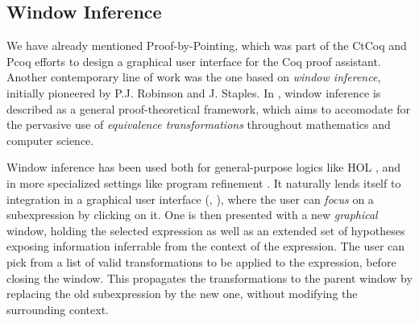 
\subsection*{Window Inference}

We have already mentioned Proof-by-Pointing, which was part of the CtCoq and
Pcoq efforts  to design a graphical user
interface for the Coq proof assistant. Another contemporary line of work was the
one based on \emph{window inference}, initially pioneered by P.J. Robinson and
J. Staples. In , window inference is
described as a general proof-theoretical framework, which aims to accomodate for
the pervasive use of \emph{equivalence transformations} throughout mathematics
and computer science.

Window inference has been used both for general-purpose logics like HOL
, and in more specialized settings like program
refinement . It naturally lends itself to
integration in a graphical user interface (,
), where the user can \emph{focus} on a subexpression by
clicking on it. One is then presented with a new \emph{graphical} window,
holding the selected expression as well as an extended set of hypotheses
exposing information inferrable from the context of the expression. The user can
pick from a list of valid transformations to be applied to the expression,
before closing the window. This propagates the transformations to the parent
window by replacing the old subexpression by the new one, without modifying the
surrounding context.

